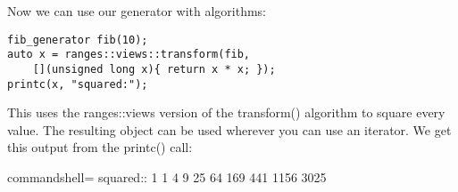 Now we can use our generator with algorithms:

\begin{lstlisting}[style=styleCXX]
fib_generator fib(10);
auto x = ranges::views::transform(fib,
	[](unsigned long x){ return x * x; });
printc(x, "squared:");
\end{lstlisting}

This uses the ranges::views version of the transform() algorithm to square every value. The resulting object can be used wherever you can use an iterator. We get this output from the printc() call:

\begin{tcblisting}{commandshell={}}
squared:: 1 1 4 9 25 64 169 441 1156 3025
\end{tcblisting}

